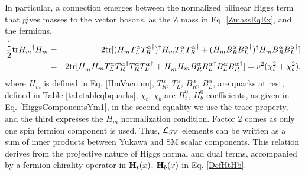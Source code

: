 \documentclass[12pt]{article}
\renewcommand\[{\begin{dmath}}
\renewcommand\]{\end{dmath}}
\begin{document}
In particular, a connection emerges between  the normalized   bilinear Higgs term that gives masses to the vector bosons, as the Z mass in Eq. \ref{ZmassEqEx},  and the fermions.
\begin{eqnarray}
\label  {YukawaSVWithWithoutf}
 \frac{1}{2}{\rm tr}      {   H_m } ^\dagger {   H_m} & = &2 {\rm tr}  [  (  H_m { T}^\alpha_{L}  {T_R^\alpha}^\dagger ) ^\dagger  {   H_m} { T}^\alpha_{L}  {T_R^\alpha}^\dagger+
 (  H_m { B}^\alpha_{R}  {B_L^\alpha}^\dagger ) ^\dagger  {   H_m} { B}^\alpha_{R}  {B_L^\alpha}^\dagger]
\\ \nonumber
&  =& 2 {\rm tr}  [      H_m^\dagger {   H_m} { T}^\alpha_{L}  {T_R^\alpha}^\dagger {{ T}^\alpha_{R}}  {T_L^\alpha}^\dagger  +
     H_m^\dagger {   H_m} { B}^\alpha_{R}  {B_L^\alpha}^\dagger {{ B}^\alpha_{L}}  {B_R^\alpha}^\dagger] = v^2 (\chi_t^2+\chi_b ^2) ,  \end{eqnarray}
where  $H_m$ is defined in Eq. \ref{HmVacuum},
      ${ T}^\alpha_{R}$,  ${ T}^\alpha_{L}$, ${ B}^\alpha_{R}$,  ${ B}^\alpha_{L}$,     are quarks     at rest, defined in     Table \ref{tab:tableqbquarks}, $\chi_t$,  $\chi_b$   are
    $H^0_t$,   $H^0_b$  coefficients, as given in Eq.   \ref{HiggsComponentsYm1},
      in the second equality we use the trace property, and the third expresses the $H_m$ normalization condition.
     Factor 2 comes as only one spin fermion component is used.
       Thus, ${\cal L}_{SV}$ elements can be written as a sum of  inner products between Yukawa and SM scalar components.
This relation derives from the  projective nature of Higgs  normal and dual  terms,
   accompanied by a   fermion chirality operator      in   ${\bf H}_t (x)$, $  {\bf   H}_b(x) $ in Eq. \ref{DefHtHb}.
\end{document}
